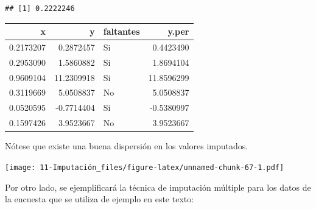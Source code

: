\documentclass[
  12pt,
]{book}
\newenvironment{Shaded}{\begin{snugshade}}{\end{snugshade}}
\newcommand{\AttributeTok}[1]{\textcolor[rgb]{0.77,0.63,0.00}{#1}}
\newcommand{\FunctionTok}[1]{\textcolor[rgb]{0.00,0.00,0.00}{#1}}
\newcommand{\NormalTok}[1]{#1}
\newcommand{\OtherTok}[1]{\textcolor[rgb]{0.56,0.35,0.01}{#1}}
\newcommand{\SpecialCharTok}[1]{\textcolor[rgb]{0.00,0.00,0.00}{#1}}
\begin{document}
\begin{Shaded}
\end{Shaded}

\begin{verbatim}
## [1] 0.2222246
\end{verbatim}

\begin{Shaded}
\end{Shaded}

\begin{tabular}{r|r|l|r}
\hline
x & y & faltantes & y.per\\
\hline
0.2173207 & 0.2872457 & Si & 0.4423490\\
\hline
0.2953090 & 1.5860882 & Si & 1.8694104\\
\hline
0.9609104 & 11.2309918 & Si & 11.8596299\\
\hline
0.3119669 & 5.0508837 & No & 5.0508837\\
\hline
0.0520595 & -0.7714404 & Si & -0.5380997\\
\hline
0.1597426 & 3.9523667 & No & 3.9523667\\
\hline
\end{tabular}

Nótese que existe una buena dispersión en los valores imputados.

\begin{Shaded}
\end{Shaded}

\texttt{[image: 11-Imputación\_files/figure-latex/unnamed-chunk-67-1.pdf]}

Por otro lado, se ejemplificará la técnica de imputación múltiple para los datos de la encuesta que se utiliza de ejemplo en este texto:
\end{document}
